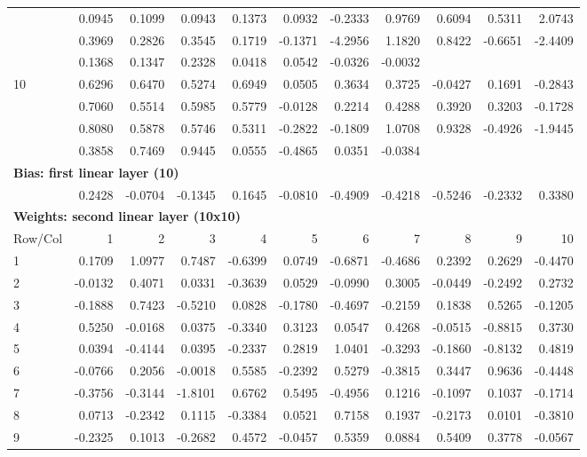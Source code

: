 \documentclass{article}
\begin{document}
\begin{tabular}{ |l|r|r|r|r|r|r|r|r|r|r| }
  & 0.0945 & 0.1099 & 0.0943 & 0.1373 & 0.0932 &-0.2333 & 0.9769 & 0.6094 & 0.5311 & 2.0743 \\
  & 0.3969 & 0.2826 & 0.3545 & 0.1719 &-0.1371 &-4.2956 & 1.1820 & 0.8422 &-0.6651 &-2.4409 \\
  & 0.1368 & 0.1347 & 0.2328 & 0.0418 & 0.0542 &-0.0326 &-0.0032 & & & \\
10& 0.6296 & 0.6470 & 0.5274 & 0.6949 & 0.0505 & 0.3634 & 0.3725 &-0.0427 & 0.1691 &-0.2843 \\
  & 0.7060 & 0.5514 & 0.5985 & 0.5779 &-0.0128 & 0.2214 & 0.4288 & 0.3920 & 0.3203 &-0.1728 \\
  & 0.8080 & 0.5878 & 0.5746 & 0.5311 &-0.2822 &-0.1809 & 1.0708 & 0.9328 &-0.4926 &-1.9445 \\
  & 0.3858 & 0.7469 & 0.9445 & 0.0555 &-0.4865 & 0.0351 &-0.0384 & & & \\
  \hline
\multicolumn{11}{|l|}{\textbf{Bias: first linear layer (10)}} \\
  \hline
 & 0.2428 & -0.0704 & -0.1345 & 0.1645 & -0.0810 & -0.4909 & -0.4218 & -0.5246 & -0.2332 & 0.3380 \\
  \hline
\multicolumn{11}{|l|}{\textbf{Weights: second linear layer (10x10)}} \\
  \hline
Row/Col & 1 & 2 & 3 & 4 & 5 & 6 & 7 & 8 & 9 & 10 \\
  \hline
 1 & 0.1709 & 1.0977 & 0.7487 &-0.6399 & 0.0749 &-0.6871 &-0.4686 &0.2392 & 0.2629 &-0.4470 \\
 2 & -0.0132 & 0.4071 & 0.0331 &-0.3639 & 0.0529 &-0.0990 & 0.3005 &-0.0449 &-0.2492 & 0.2732 \\
 3 & -0.1888 & 0.7423 &-0.5210 & 0.0828 &-0.1780 &-0.4697 &-0.2159 &0.1838 & 0.5265 &-0.1205 \\
 4 &  0.5250 &-0.0168 & 0.0375 &-0.3340 & 0.3123 & 0.0547 & 0.4268 &-0.0515 &-0.8815 & 0.3730 \\
 5 &  0.0394 &-0.4144 & 0.0395 &-0.2337 & 0.2819 & 1.0401 &-0.3293 &-0.1860 &-0.8132 & 0.4819 \\
 6 & -0.0766 & 0.2056 &-0.0018 & 0.5585 &-0.2392 & 0.5279 &-0.3815 &0.3447 & 0.9636 &-0.4448 \\
 7 & -0.3756 &-0.3144 &-1.8101 & 0.6762 & 0.5495 &-0.4956 & 0.1216 &-0.1097 & 0.1037 &-0.1714 \\
 8 &  0.0713 &-0.2342 & 0.1115 &-0.3384 & 0.0521 & 0.7158 & 0.1937 &-0.2173 & 0.0101 &-0.3810 \\
 9 & -0.2325 & 0.1013 &-0.2682 & 0.4572 &-0.0457 & 0.5359 & 0.0884 &0.5409 & 0.3778 &-0.0567 \\

\end{tabular}
\end{document}

